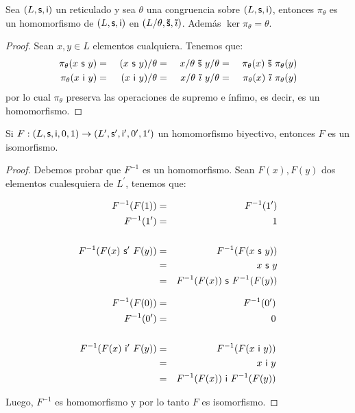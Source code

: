   \begin{lemma} \label{lemma_11}
    \PN Sea $(L, \mathsf{s}, \mathsf{i})$ un reticulado y sea $\theta$ una congruencia sobre $(L, \mathsf{s}, \mathsf{i})$, entonces $\pi_{\theta}$ es un homomorfismo
    de $(L, \mathsf{s}, \mathsf{i})$ en $(L/\theta, \mathsf{\tilde{s}}, \mathsf{\tilde{\imath}})$. Además $\ker \pi_{\theta} = \theta$.
  \end{lemma}
  \begin{proof}
    \PN Sean $x, y \in L$ elementos cualquiera. Tenemos que:
      \begin{alignat*}{4}
        \pi_{\theta}(x \ \SU \ y) &=& \ (x \ \SU \ y)/\theta &=& \ x/\theta \ \mathsf{\tilde{s}} \ y/\theta &=&
          \ \pi_{\theta}(x) \ \mathsf{\tilde{s}} \ \pi_{\theta}(y) \\
        \pi_{\theta}(x \ \IN \ y) &=& \ (x \ \IN \ y)/\theta &=& \ x/\theta \ \mathsf{\tilde{\imath}} \ y/\theta &=&
          \ \pi_{\theta}(x) \ \mathsf{\tilde{\imath}} \ \pi_{\theta}(y)
      \end{alignat*}
    \PN por lo cual $\pi_{\theta}$ preserva las operaciones de supremo e ínfimo, es decir, es un homomorfismo.
  \end{proof}

  \begin{lemma} \label{lemma_12}
    \PN Si $F: (L, \mathsf{s}, \mathsf{i}, 0, 1) \rightarrow (L^{\prime}, \mathsf{s}^{\prime}, \mathsf{i}^{\prime}, 0^{\prime}, 1^{\prime})$ un homomorfismo biyectivo, entonces $F$ es un isomorfismo.
  \end{lemma}
  \begin{proof}
      \PN Debemos probar que $F^{-1}$ es un homomorfismo. Sean $F(x), F(y)$ dos elementos cualesquiera de $L^{\prime}$,
      tenemos que:
      \begin{multicols}{2}
        \begin{eqnarray*}
          F^{-1}(F(1)) &=& F^{-1}(1^{\prime}) \\
          F^{-1}(1^{\prime}) &=& 1 \\
          \\
          F^{-1}(F(x) \ \SU^{\prime} \ F(y)) &=& F^{-1}(F(x \ \SU \ y)) \\
          &=& x \ \SU \ y \\
          &=& F^{-1}(F(x)) \ \SU \ F^{-1}(F(y))
        \end{eqnarray*}

        \begin{eqnarray*}
          F^{-1}(F(0)) &=& F^{-1}(0^{\prime}) \\
          F^{-1}(0^{\prime}) &=& 0 \\
          \\
          F^{-1}(F(x) \ \IN^{\prime} \ F(y)) &=& F^{-1}(F(x \ \IN \ y)) \\
          &=& x \ \IN \ y \\
          &=& F^{-1}(F(x)) \ \IN \ F^{-1}(F(y))
        \end{eqnarray*}
      \end{multicols}

      \PN Luego, $F^{-1}$ es homomorfismo y por lo tanto $F$ es isomorfismo.
  \end{proof}

